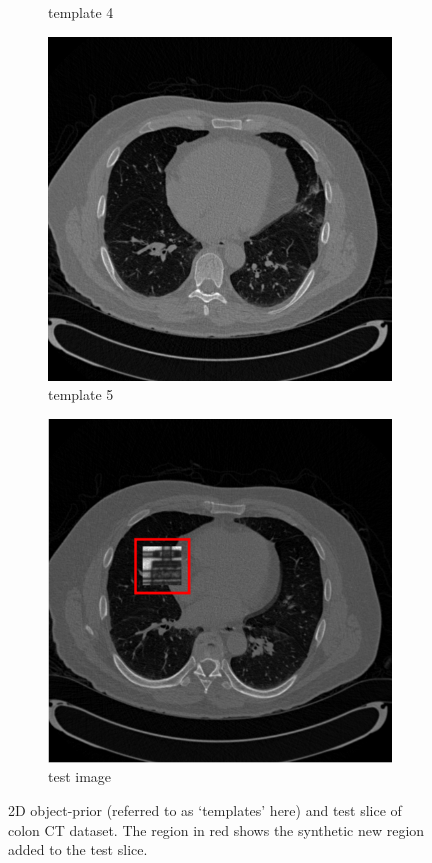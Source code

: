 \documentclass{article}
\begin{document}
\begin{figure}[h]
\begin{subfigure}[b]{0.3\linewidth}
        \caption{template 4}
     \end{subfigure}
\quad
    \begin{subfigure}[b]{0.3\linewidth}
        \includegraphics[width=\textwidth]{../images/supplementary/colon/template5.png}
        \caption{template 5}
     \end{subfigure}
\quad
    \begin{subfigure}[b]{0.3\linewidth}
        \includegraphics[width=\textwidth]{../images/supplementary/colon/testIm.png}
        \caption{test image}
     \end{subfigure}
      \caption{2D object-prior (referred to as `templates' here)  and test slice of colon CT dataset. The region in red shows the synthetic new region added to the test slice.}
\label{fig:joint}
\end{figure}
\end{document}
